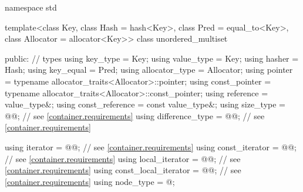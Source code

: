 %
\begin{codeblock}
namespace std {
  template<class Key,
           class Hash = hash<Key>,
           class Pred = equal_to<Key>,
           class Allocator = allocator<Key>>
  class unordered_multiset {
  public:
    // types
    using key_type             = Key;
    using value_type           = Key;
    using hasher               = Hash;
    using key_equal            = Pred;
    using allocator_type       = Allocator;
    using pointer              = typename allocator_traits<Allocator>::pointer;
    using const_pointer        = typename allocator_traits<Allocator>::const_pointer;
    using reference            = value_type&;
    using const_reference      = const value_type&;
    using size_type            = @@; // see \ref{container.requirements}
    using difference_type      = @@; // see \ref{container.requirements}

    using iterator             = @@; // see \ref{container.requirements}
    using const_iterator       = @@; // see \ref{container.requirements}
    using local_iterator       = @@; // see \ref{container.requirements}
    using const_local_iterator = @@; // see \ref{container.requirements}
    using node_type            = @\unspec@;

}}
\end{codeblock}

